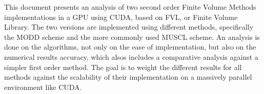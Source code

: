 This document presents an analysis of two second order Finite Volume Methods implementations in a GPU using CUDA, based on FVL, or Finite Volume Library. The two versions are implemented using different methods, specifically the MODD scheme and the more commonly used MUSCL scheme. An analysis is done on the algorithms, not only on the ease of implementation, but also on the numerical results accuracy, which alsos includes a comparative analysis against a simpler first order method. The goal is to weight the different results for all methods against the scalability of their implementation on a massively parallel environment like CUDA.